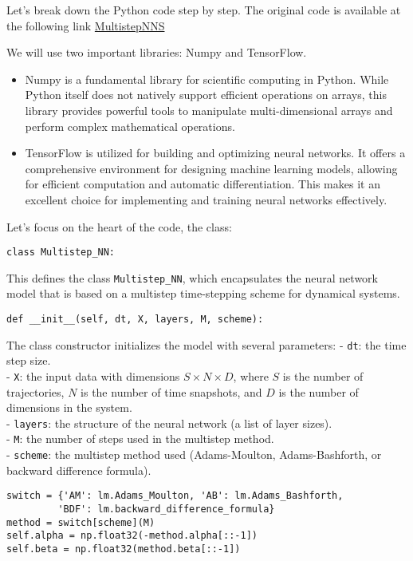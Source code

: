 Let's break down the Python code step by step.
The original code is available at the following link \hyperlink{https://github.com/maziarraissi/MultistepNNs}{MultistepNNS}

We will use two important libraries: Numpy and TensorFlow. 
\begin{itemize}
    \item Numpy is a fundamental library for scientific computing in Python. While Python itself does not natively support efficient operations on arrays, this library provides powerful tools to manipulate multi-dimensional arrays and perform complex mathematical operations.
    \item TensorFlow is utilized for building and optimizing neural networks. It offers a comprehensive environment for designing machine learning models, allowing for efficient computation and automatic differentiation. This makes it an excellent choice for implementing and training neural networks effectively.
\end{itemize}

Let's focus on the heart of the code, the class:
\begin{verbatim}
class Multistep_NN:
\end{verbatim}
This defines the class \texttt{Multistep\_NN}, which encapsulates the neural network model that is based on a multistep time-stepping scheme for dynamical systems.

\begin{verbatim}
def __init__(self, dt, X, layers, M, scheme):
\end{verbatim}

The class constructor initializes the model with several parameters:
- \texttt{dt}: the time step size.\\
- \texttt{X}: the input data with dimensions $S \times N \times D$, where $S$ is the number of trajectories, $N$ is the number of time snapshots, and $D$ is the number of dimensions in the system.\\
- \texttt{layers}: the structure of the neural network (a list of layer sizes).\\
- \texttt{M}: the number of steps used in the multistep method.\\
- \texttt{scheme}: the multistep method used (Adams-Moulton, Adams-Bashforth, or backward difference formula).

\begin{verbatim}
switch = {'AM': lm.Adams_Moulton, 'AB': lm.Adams_Bashforth, 
         'BDF': lm.backward_difference_formula}
method = switch[scheme](M)
self.alpha = np.float32(-method.alpha[::-1])
self.beta = np.float32(method.beta[::-1])
\end{verbatim}

